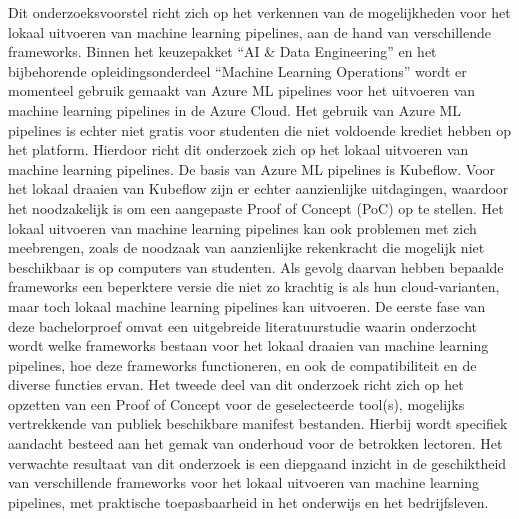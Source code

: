 Dit onderzoeksvoorstel richt zich op het verkennen van de mogelijkheden voor het lokaal uitvoeren van machine learning pipelines, aan de hand van verschillende frameworks.
Binnen het keuzepakket ``AI \& Data Engineering'' en het bijbehorende opleidingsonderdeel ``Machine Learning Operations'' wordt er momenteel gebruik gemaakt van Azure ML pipelines voor het uitvoeren van machine learning pipelines in de Azure Cloud.
Het gebruik van Azure ML pipelines is echter niet gratis voor studenten die niet voldoende krediet hebben op het platform. Hierdoor richt dit onderzoek zich op het lokaal uitvoeren van machine learning pipelines.
De basis van Azure ML pipelines is Kubeflow. Voor het lokaal draaien van Kubeflow zijn er echter aanzienlijke uitdagingen, waardoor het noodzakelijk is om een aangepaste Proof of Concept (PoC) op te stellen.
Het lokaal uitvoeren van machine learning pipelines kan ook problemen met zich meebrengen, zoals de noodzaak van aanzienlijke rekenkracht die mogelijk niet beschikbaar is op computers van studenten. Als gevolg daarvan hebben bepaalde frameworks een beperktere versie die niet zo krachtig is als hun cloud-varianten, maar toch lokaal machine learning pipelines kan uitvoeren.
De eerste fase van deze bachelorproef omvat een uitgebreide literatuurstudie waarin onderzocht wordt welke frameworks bestaan voor het lokaal draaien van machine learning pipelines, hoe deze frameworks functioneren, en ook de compatibiliteit en de diverse functies ervan.
Het tweede deel van dit onderzoek richt zich op het opzetten van een Proof of Concept voor de geselecteerde tool(s), mogelijks vertrekkende van publiek beschikbare manifest bestanden. Hierbij wordt specifiek aandacht besteed aan het gemak van onderhoud voor de betrokken lectoren.
Het verwachte resultaat van dit onderzoek is een diepgaand inzicht in de geschiktheid van verschillende frameworks voor het lokaal uitvoeren van machine learning pipelines, met praktische toepasbaarheid in het onderwijs en het bedrijfsleven.
